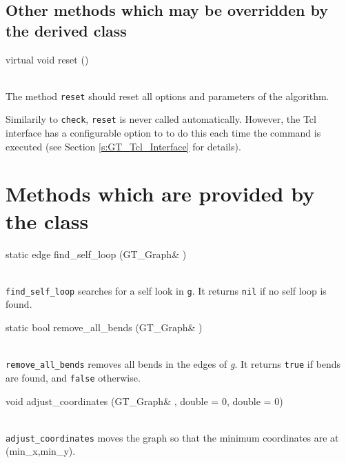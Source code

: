 \documentclass[twoside,fleqn]{report}
\begin{document}
%
%

\subsection{Other methods which may be overridden by the derived class}

\begin{Cdefinition}
  
  \item[virtual void reset ()] \strut\\
  The method \texttt{reset} should reset all options and
  parameters of the algorithm.
  
  Similarily to \texttt{check}, \texttt{reset} is never called
  automatically.  However, the Tcl interface has a configurable
  option to to do this each time the command is executed (see
  Section \ref{s:GT_Tcl_Interface} for details).

\end{Cdefinition}


%
%

\section{Methods which are provided by the class }

\begin{Cdefinition}
  
  \item[static edge find\_self\_loop (GT\_Graph\& \Param{g})] \strut\\
  \texttt{find\_self\_loop} searches for a self look in
  \texttt{g}. It returns \texttt{nil} if no self loop is found.
  
  \item[static bool remove\_all\_bends (GT\_Graph\& \Param{g})] \strut\\
  \texttt{remove\_all\_bends} removes all bends in the edges of \emph{g}.
  It returns \texttt{true} if bends are found, and \texttt{false} 
  otherwise.

  \item[void adjust\_coordinates (GT\_Graph\& \Param{g},
  double \Param{min\_x} = 0,
  double \Param{min\_y} = 0)]
  \strut\\
  \texttt{adjust\_coordinates} moves the graph so that the minimum 
  coordinates are at (min\_x,min\_y).  

\end{Cdefinition}
\end{document}
